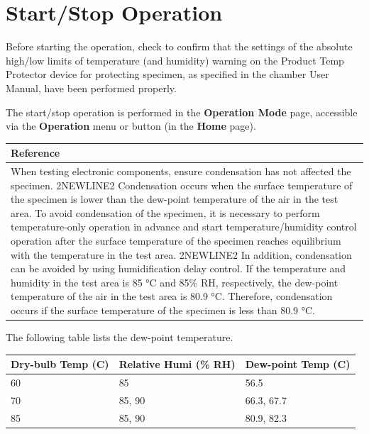 \section{Start/Stop Operation}

Before starting the operation, check to confirm that the settings of the
absolute high/low limits of temperature (and humidity) warning on the
Product Temp Protector device for protecting specimen, as specified in
the chamber User Manual, have been performed properly.

The start/stop operation is performed in the \textbf{Operation Mode}
page, accessible via the \textbf{Operation} menu or button (in the
\textbf{Home} page).

\begin{longtable}[]{@{}l@{}}
\toprule
\begin{minipage}[b]{0.97\columnwidth}\raggedright
\textbf{Reference}\strut
\end{minipage}\tabularnewline
\midrule
\endhead
\begin{minipage}[t]{0.97\columnwidth}\raggedright
When testing electronic components, ensure condensation has not affected
the specimen. 2NEWLINE2 Condensation occurs when the surface temperature
of the specimen is lower than the dew-point temperature of the air in
the test area. To avoid condensation of the specimen, it is necessary to
perform temperature-only operation in advance and start
temperature/humidity control operation after the surface temperature of
the specimen reaches equilibrium with the temperature in the test area.
2NEWLINE2 In addition, condensation can be avoided by using
humidification delay control. If the temperature and humidity in the
test area is 85 °C and 85\% RH, respectively, the dew-point temperature
of the air in the test area is 80.9 °C. Therefore, condensation occurs
if the surface temperature of the specimen is less than 80.9 °C.\strut
\end{minipage}\tabularnewline
\bottomrule
\end{longtable}

The following table lists the dew-point temperature.

\begin{longtable}[]{@{}lll@{}}
\toprule
Dry-bulb Temp (C) & Relative Humi (\% RH) & Dew-point Temp
(C)\tabularnewline
\midrule
\endhead
60 & 85 & 56.5\tabularnewline
70 & 85, 90 & 66.3, 67.7\tabularnewline
85 & 85, 90 & 80.9, 82.3\tabularnewline
\bottomrule
\end{longtable}


